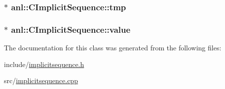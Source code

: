 \label{classanl_1_1CImplicitSequence_a58b84597820e57aefbc9f0ad5405136e}
\hypertarget{classanl_1_1CImplicitSequence_afafc9a1412d549d9ee0b11366e5c86b8}{
\subsubsection[{tmp}]{$\ast$ {\bf anl::CImplicitSequence::tmp}}}
\label{classanl_1_1CImplicitSequence_afafc9a1412d549d9ee0b11366e5c86b8}
\hypertarget{classanl_1_1CImplicitSequence_a82194754c6382be31fe9130ae018115e}{
\subsubsection[{value}]{$\ast$ {\bf anl::CImplicitSequence::value}}}
\label{classanl_1_1CImplicitSequence_a82194754c6382be31fe9130ae018115e}


The documentation for this class was generated from the following files:\begin{DoxyCompactItemize}
\item 
include/\hyperlink{implicitsequence_8h}{implicitsequence.h}\item 
src/\hyperlink{implicitsequence_8cpp}{implicitsequence.cpp}\end{DoxyCompactItemize}
